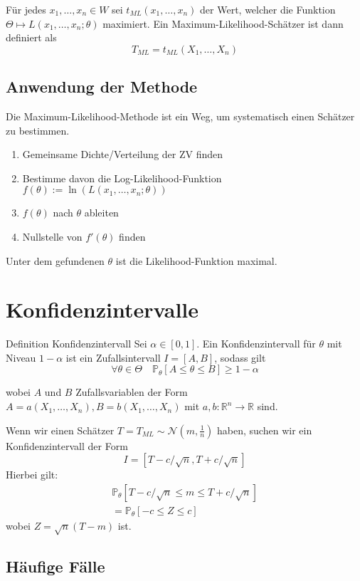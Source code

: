 \documentclass[a4paper,10pt]{article}
\def\R{\mathbb{R}}
\def\P{\mathbb{P}}
\begin{document}
\noindent Für jedes \(x_1, \ldots, x_n \in W\) sei \(t_{ML}(x_1, \ldots, x_n)\) der Wert, welcher die Funktion \(\Theta \mapsto L(x_1, \ldots, x_n; \theta)\) maximiert. Ein Maximum-Likelihood-Schätzer ist dann definiert als
\[T_{ML} = t_{ML}(X_1, \ldots, X_n)\]

\subsection{Anwendung der Methode}
Die Maximum-Likelihood-Methode ist ein Weg, um systematisch einen Schätzer zu bestimmen.
\begin{enumerate}
	\item Gemeinsame Dichte/Verteilung der ZV finden
	\item Bestimme davon die Log-Likelihood-Funktion\\ \(f(\theta) := \ln(L(x_1, \ldots, x_n;\theta))\) 
	\item \(f(\theta)\) nach \(\theta\) ableiten
	\item Nullstelle von \(f'(\theta)\) finden
\end{enumerate}
Unter dem gefundenen \(\theta\) ist die Likelihood-Funktion maximal.

\section{Konfidenzintervalle}
\begin{mainbox}{Definition Konfidenzintervall}
	Sei \(\alpha \in [0,1]\). Ein Konfidenzintervall für \(\theta\) mit Niveau \(1 - \alpha\) ist ein Zufallsintervall \(I=[A,B]\), sodass gilt
	\[\forall \theta \in \Theta \quad \P_\theta[A\le \theta \le B] \ge 1- \alpha\]

	wobei \(A\) und \(B\) Zufallsvariablen der Form \(A = a(X_1, \ldots, X_n), B = b(X_1, \ldots, X_n)\) mit \(a,b: \R^n \to \R\) sind.
\end{mainbox}

Wenn wir einen Schätzer \(T = T_{ML} \sim \mathcal{N}(m, \frac{1}{n})\) haben, suchen wir ein Konfidenzintervall der Form
\[I = [T-c/\sqrt{n}, T+c/\sqrt{n}]\]
Hierbei gilt:
\begin{align*}
	\P_\theta[T-c/\sqrt{n} \le m \le T+c/\sqrt{n}] \\
	= \P_\theta[-c\le Z \le c]
\end{align*}
wobei \(Z = \sqrt{n}(T-m)\) ist.

\subsection{Häufige Fälle}
\end{document}
